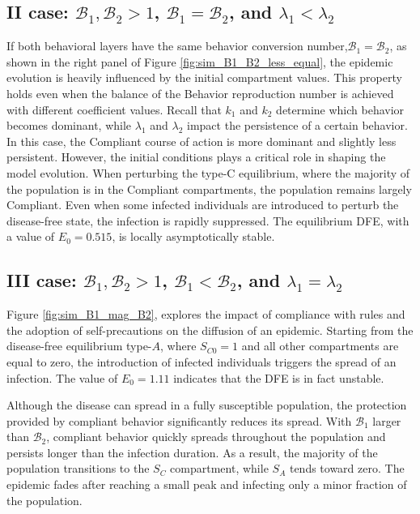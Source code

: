 \subsection{II case: $\mathcal{B}_1, \mathcal{B}_2 >1$, $\mathcal{B}_1 =  \mathcal{B}_2$, and $\lambda_1 < \lambda_2$}
If both behavioral layers have the same behavior conversion number,$\mathcal{B}_1 = \mathcal{B}_2$, as shown in the right panel of Figure \ref{fig:sim_B1_B2_less_equal}, the epidemic evolution is heavily influenced by the initial compartment values. This property holds even when the balance of the Behavior reproduction number is achieved with different coefficient values. Recall that $k_1$ and $k_2$ determine which behavior becomes dominant, while $\lambda_1$ and $\lambda_2$ impact the persistence of a certain behavior. In this case, the Compliant course of action is more dominant and slightly less persistent. However, the initial conditions plays a critical role in shaping the model evolution. When perturbing the type-C equilibrium, where the majority of the population is in the Compliant compartments, the population remains largely Compliant. Even when some infected individuals are introduced to perturb the disease-free state, the infection is rapidly suppressed. The equilibrium DFE, with a value of $E_0 = 0.515$, is locally asymptotically stable.


\subsection{III case: $\mathcal{B}_1, \mathcal{B}_2 >1$, $\mathcal{B}_1 <  \mathcal{B}_2$, and $\lambda_1 = \lambda_2$}
Figure \ref{fig:sim_B1_mag_B2}, explores the impact of compliance with rules and the adoption of self-precautions on the diffusion of an epidemic. Starting from the disease-free equilibrium type-$A$, where $S_{C0} = 1$ and all other compartments are equal to zero, the introduction of infected individuals triggers the spread of an infection. The value of $E_0 = 1.11$ indicates that the DFE is in fact unstable.

Although the disease can spread in a fully susceptible population, the protection provided by compliant behavior significantly reduces its spread. With $\mathcal{B}_1$ larger than $\mathcal{B}_2$, compliant behavior quickly spreads throughout the population and persists longer than the infection duration. As a result, the majority of the population transitions to the $S_C$ compartment, while $S_A$ tends toward zero. The epidemic fades after reaching a small peak and infecting only a minor fraction of the population.

